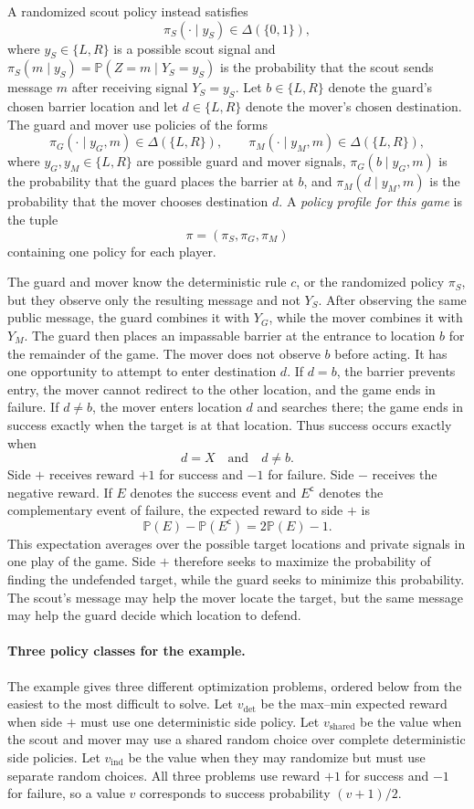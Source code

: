 A randomized scout policy instead satisfies
\[
    \pi_S(\cdot\mid y_S)
    \in\Delta(\{0,1\}),
\]
where $y_S\in\{L,R\}$ is a possible scout signal and $\pi_S(m\mid y_S)=\mathbb{P}(Z=m\mid Y_S=y_S)$ is the probability that the scout sends message $m$ after receiving signal $Y_S=y_S$. Let $b\in\{L,R\}$ denote the guard's chosen barrier location and let $d\in\{L,R\}$ denote the mover's chosen destination. The guard and mover use policies of the forms
\[
    \pi_G(\cdot\mid y_G,m)
    \in\Delta(\{L,R\}),
    \qquad
    \pi_M(\cdot\mid y_M,m)
    \in\Delta(\{L,R\}),
\]
where $y_G,y_M\in\{L,R\}$ are possible guard and mover signals, $\pi_G(b\mid y_G,m)$ is the probability that the guard places the barrier at $b$, and $\pi_M(d\mid y_M,m)$ is the probability that the mover chooses destination $d$. A \emph{policy profile for this game} is the tuple
\[
    \pi=(\pi_S,\pi_G,\pi_M)
\]
containing one policy for each player.

The guard and mover know the deterministic rule $c$, or the randomized policy $\pi_S$, but they observe only the resulting message and not $Y_S$. After observing the same public message, the guard combines it with $Y_G$, while the mover combines it with $Y_M$. The guard then places an impassable barrier at the entrance to location $b$ for the remainder of the game. The mover does not observe $b$ before acting. It has one opportunity to attempt to enter destination $d$. If $d=b$, the barrier prevents entry, the mover cannot redirect to the other location, and the game ends in failure. If $d\neq b$, the mover enters location $d$ and searches there; the game ends in success exactly when the target is at that location. Thus success occurs exactly when
\[
    d=X
    \quad\text{and}\quad
    d\neq b.
\]
Side $+$ receives reward $+1$ for success and $-1$ for failure. Side $-$ receives the negative reward. If $E$ denotes the success event and $E^{\mathsf c}$ denotes the complementary event of failure, the expected reward to side $+$ is
\[
    \mathbb{P}(E)-\mathbb{P}(E^{\mathsf c})
    =
    2\mathbb{P}(E)-1.
\]
This expectation averages over the possible target locations and private signals in one play of the game. Side $+$ therefore seeks to maximize the probability of finding the undefended target, while the guard seeks to minimize this probability. The scout's message may help the mover locate the target, but the same message may help the guard decide which location to defend.


\paragraph{Three policy classes for the example.}
The example gives three different optimization problems, ordered below from the easiest to the most difficult to solve. Let $v_{\mathrm{det}}$ be the max--min expected reward when side $+$ must use one deterministic side policy. Let $v_{\mathrm{shared}}$ be the value when the scout and mover may use a shared random choice over complete deterministic side policies. Let $v_{\mathrm{ind}}$ be the value when they may randomize but must use separate random choices. All three problems use reward $+1$ for success and $-1$ for failure, so a value $v$ corresponds to success probability $(v+1)/2$.

